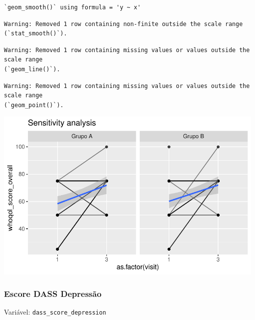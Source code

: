 \documentclass[
  letterpaper,
  DIV=11,
  numbers=noendperiod]{scrartcl}
\begin{document}
\begin{verbatim}
`geom_smooth()` using formula = 'y ~ x'
\end{verbatim}

\begin{verbatim}
Warning: Removed 1 row containing non-finite outside the scale range
(`stat_smooth()`).
\end{verbatim}

\begin{verbatim}
Warning: Removed 1 row containing missing values or values outside the scale range
(`geom_line()`).
\end{verbatim}

\begin{verbatim}
Warning: Removed 1 row containing missing values or values outside the scale range
(`geom_point()`).
\end{verbatim}

\includegraphics{Outcomes_V1V2V3_files/figure-pdf/whoqol_score_overall_6-2.pdf}

\subsubsection{Escore DASS Depressão}\label{escore-dass-depressuxe3o}

Variável: \texttt{dass\_score\_depression}
\end{document}
